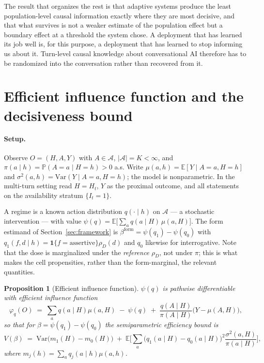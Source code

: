 \documentclass[11pt]{article}
\newtheorem{proposition}{Proposition}
\theoremstyle{definition}
\theoremstyle{remark}
\newcommand{\E}{\mathbb{E}}
\newcommand{\Prob}{\mathbb{P}}
\newcommand{\Var}{\mathrm{Var}}
\begin{document}
The result that organizes the rest is that adaptive systems produce the
least population-level causal information exactly where they are most
decisive, and that what survives is not a weaker estimate of the population
effect but a boundary effect at a threshold the system chose. A deployment
that has learned its job well is, for this purpose, a deployment that has
learned to stop informing us about it. Turn-level causal knowledge about
conversational AI therefore has to be randomized into the conversation
rather than recovered from it.

\appendix

\section{Efficient influence function and the decisiveness bound}
\label{app:eif}

\paragraph{Setup.} Observe $O = (H, A, Y)$ with $A \in \mathcal{A}$,
$|\mathcal{A}| = K < \infty$, and $\pi(a \mid h) = \Prob(A = a \mid H = h) >
0$ a.s. Write $\mu(a,h) = \E[Y \mid A=a, H=h]$ and $\sigma^2(a,h) = \Var(Y
\mid A=a, H=h)$; the model is nonparametric. In the multi-turn setting read
$H = H_t$, $Y$ as the proximal outcome, and all statements on the
availability stratum $\{I_t = 1\}$.

A regime is a known action distribution $q(\cdot \mid h)$ on $\mathcal{A}$
--- a stochastic intervention --- with value
$\psi(q) = \E\big[\sum_a q(a \mid H)\,\mu(a,H)\big]$. The form estimand of
Section~\ref{sec:framework} is $\beta^{\mathrm{form}} = \psi(q_1) -
\psi(q_0)$ with $q_1(f,d \mid h) = \mathbf{1}\{f = \text{assertive}\}
\rho_D(d)$ and $q_0$ likewise for interrogative. Note that the dose is
marginalized under the \emph{reference} $\rho_D$, not under $\pi$; this is
what makes the cell propensities, rather than the form-marginal, the
relevant quantities.

\begin{proposition}[Efficient influence function]\label{prop:eif}
$\psi(q)$ is pathwise differentiable with efficient influence function
\[
\varphi_q(O) \;=\; \sum_a q(a \mid H)\mu(a,H) \;-\; \psi(q) \;+\;
\frac{q(A \mid H)}{\pi(A \mid H)}\big(Y - \mu(A,H)\big),
\]
so that for $\beta = \psi(q_1) - \psi(q_0)$ the semiparametric efficiency
bound is
\begin{equation}\label{eq:E1}
V(\beta) \;=\; \Var\big(m_1(H) - m_0(H)\big) \;+\;
\E\Big[\textstyle\sum_a \big(q_1(a \mid H) - q_0(a \mid H)\big)^2
\frac{\sigma^2(a,H)}{\pi(a \mid H)}\Big],
\end{equation}
where $m_j(h) = \sum_a q_j(a \mid h)\mu(a,h)$.
\end{proposition}
\end{document}

